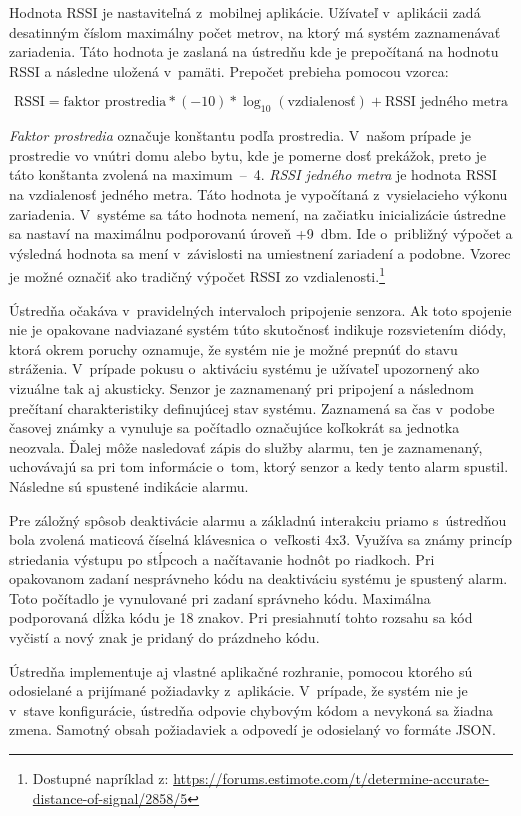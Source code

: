 Hodnota RSSI je nastaviteľná z~mobilnej aplikácie. Užívateľ v~aplikácii zadá desatinným číslom maximálny počet metrov, na ktorý má systém zaznamenávať zariadenia. Táto hodnota je zaslaná na ústredňu kde je prepočítaná na hodnotu RSSI a následne uložená v~pamäti. Prepočet prebieha pomocou vzorca:

$$\text{RSSI} = \text{faktor prostredia} * (- 10) * \log_{10}(\text{vzdialenosť}) + \text{RSSI jedného metra}$$

\textit{Faktor prostredia} označuje konštantu podľa prostredia. V~našom prípade je prostredie vo vnútri domu alebo bytu, kde je pomerne dosť prekážok, preto je táto konštanta zvolená na maximum~--~4. \textit{RSSI jedného metra} je hodnota RSSI na vzdialenosť jedného metra. Táto hodnota je vypočítaná z~vysielacieho výkonu zariadenia. V~systéme sa táto hodnota nemení, na začiatku inicializácie ústredne sa nastaví na maximálnu podporovanú úroveň +9~dbm. Ide o~približný výpočet a výsledná hodnota sa mení v~závislosti na umiestnení zariadení a podobne. Vzorec je možné označiť ako tradičný výpočet RSSI zo vzdialenosti.\footnote{Dostupné napríklad z: \url{https://forums.estimote.com/t/determine-accurate-distance-of-signal/2858/5}}

Ústredňa očakáva v~pravidelných intervaloch pripojenie senzora. Ak toto spojenie nie je opakovane nadviazané systém túto skutočnosť indikuje rozsvietením diódy, ktorá okrem poruchy oznamuje, že systém nie je možné prepnúť do stavu stráženia. V~prípade pokusu o~aktiváciu systému je užívateľ upozornený ako vizuálne tak aj akusticky. Senzor je zaznamenaný pri pripojení a následnom prečítaní charakteristiky definujúcej stav systému. Zaznamená sa čas v~podobe časovej známky a vynuluje sa počítadlo označujúce koľkokrát sa jednotka neozvala. Ďalej môže nasledovať zápis do služby alarmu, ten je zaznamenaný, uchovávajú sa pri tom informácie o~tom, ktorý senzor a kedy tento alarm spustil. Následne sú spustené indikácie alarmu.

Pre záložný spôsob deaktivácie alarmu a základnú interakciu priamo s~ústredňou bola zvolená maticová číselná klávesnica o~veľkosti 4x3. Využíva sa známy princíp striedania výstupu po stĺpcoch a načítavanie hodnôt po riadkoch. Pri opakovanom zadaní nesprávneho kódu na deaktiváciu systému je spustený alarm. Toto počítadlo je vynulované pri zadaní správneho kódu. Maximálna podporovaná dĺžka kódu je 18 znakov. Pri presiahnutí tohto rozsahu sa kód vyčistí a nový znak je pridaný do prázdneho kódu.

Ústredňa implementuje aj vlastné aplikačné rozhranie, pomocou ktorého sú odosielané a prijímané požiadavky z~aplikácie. V~prípade, že systém nie je v~stave konfigurácie, ústredňa odpovie chybovým kódom a nevykoná sa žiadna zmena. Samotný obsah požiadaviek a odpovedí je odosielaný vo formáte JSON.


